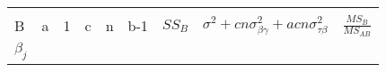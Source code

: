 \documentclass[12pt,]{article}
\begin{document}
\begin{longtable}[]{@{}lllllllll@{}}
\begin{minipage}[t]{0.03\columnwidth}
\strut
\end{minipage} & \begin{minipage}[t]{0.03\columnwidth}\raggedright
\strut
\end{minipage} & \begin{minipage}[t]{0.03\columnwidth}\raggedright
\strut
\end{minipage} & \begin{minipage}[t]{0.12\columnwidth}\raggedright
\strut
\end{minipage} & \begin{minipage}[t]{0.15\columnwidth}\raggedright
\strut
\end{minipage} & \begin{minipage}[t]{0.21\columnwidth}\raggedright
\strut
\end{minipage} & \begin{minipage}[t]{0.09\columnwidth}\raggedright
\strut
\end{minipage}\tabularnewline
\begin{minipage}[t]{0.06\columnwidth}\raggedright
B\strut
\end{minipage} & \begin{minipage}[t]{0.03\columnwidth}\raggedright
a\strut
\end{minipage} & \begin{minipage}[t]{0.03\columnwidth}\raggedright
1\strut
\end{minipage} & \begin{minipage}[t]{0.03\columnwidth}\raggedright
c\strut
\end{minipage} & \begin{minipage}[t]{0.03\columnwidth}\raggedright
n\strut
\end{minipage} & \begin{minipage}[t]{0.12\columnwidth}\raggedright
b-1\strut
\end{minipage} & \begin{minipage}[t]{0.15\columnwidth}\raggedright
\(SS_B\)\strut
\end{minipage} & \begin{minipage}[t]{0.21\columnwidth}\raggedright
\(\sigma^2+cn\sigma^2_{\beta\gamma}+acn\sigma^2_{\tau\beta}\)\strut
\end{minipage} & \begin{minipage}[t]{0.09\columnwidth}\raggedright
\(\frac{MS_{B}}{MS_{AB}}\)\strut
\end{minipage}\tabularnewline
\begin{minipage}[t]{0.06\columnwidth}\raggedright
\(\beta_{j}\)\strut

\end{minipage}
\end{longtable}
\end{document}
